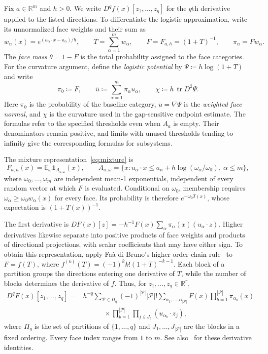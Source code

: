 \documentclass[11pt,letterpaper]{article}
\theoremstyle{remark}
\newcommand{\E}{\mathbb E}
\newcommand{\R}{\mathbb R}
\newcommand{\tr}{\operatorname{tr}}
\newcommand{\ind}{\mathbf 1}
\begin{document}
Fix \(a\in\R^m\) and \(h>0\). We write
\(D^qf(x)[z_1,\ldots,z_q]\) for the \(q\)th derivative applied to
the listed directions. To differentiate the logistic approximation,
write its unnormalized face weights and their sum as
\[
 w_\alpha(x)=e^{(u_\alpha\cdot x-a_\alpha)/h},\qquad
 T=\sum_{\alpha=1}^m w_\alpha,\qquad
 F=F_{a,h}=(1+T)^{-1},\qquad \pi_\alpha=Fw_\alpha.
\]
The \emph{face mass} \(\theta=1-F\) is the total probability assigned
to the face categories. For the curvature argument, define the
\emph{logistic potential} by \(\Psi\coloneqq h\log(1+T)\) and write
\[
 \pi_0\coloneqq F,\qquad
 \bar u\coloneqq\sum_{\alpha=1}^m\pi_\alpha u_\alpha,
 \qquad \chi\coloneqq h\,\tr D^2\Psi.
\]
Here \(\pi_0\) is the probability of the baseline category,
\(\bar u=\nabla\Psi\) is the \emph{weighted face normal}, and
\(\chi\) is the curvature used in the gap-sensitive endpoint
estimate. The formulas refer to the specified thresholds even when
\(A_a\) is empty. Their denominators remain positive, and limits
with unused thresholds tending to infinity give the corresponding
formulas for subsystems.

The mixture representation~\eqref{eq:mixture} is
\[
 F_{a,h}(x)=\E_\omega\ind_{A_{a,\omega}}(x),\qquad
 A_{a,\omega}=\{x:u_\alpha\cdot x\le
 a_\alpha+h\log(\omega_\alpha/\omega_0),\ \alpha\le m\},
\]
where \(\omega_0,\ldots,\omega_m\) are independent mean-1
exponentials, independent of every random vector at which \(F\) is
evaluated. Conditional on \(\omega_0\), membership requires
\(\omega_\alpha\ge\omega_0w_\alpha(x)\) for every face.
Its probability is therefore \(e^{-\omega_0T(x)}\), whose
expectation is \((1+T(x))^{-1}\).

The first derivative is
\(DF(x)[z]=-h^{-1}F(x)\sum_\alpha\pi_\alpha(x)(u_\alpha\cdot z)\).
Higher derivatives likewise separate into positive products of face
weights and products of directional projections, with scalar coefficients
that may have either sign. To obtain this representation, apply
Fa\`a di Bruno's higher-order chain rule~\cite{Comtet1974}
to \(F=f(T)\), where
\(f^{(k)}(T)=(-1)^k k!(1+T)^{-k-1}\). Each block of a partition
groups the directions entering one derivative of \(T\), while the
number of blocks determines the derivative of \(f\). Thus, for
\(z_1,\ldots,z_q\in\R^r\),
\begin{equation}
 \begin{split}
 D^qF(x)[z_1,\ldots,z_q]
 ={}&h^{-q}\sum_{\mathcal P\in\Pi_q}(-1)^{|\mathcal P|}|\mathcal P|!
 \sum_{\alpha_1,\ldots,\alpha_{|\mathcal P|}}
 F(x)\prod_{b=1}^{|\mathcal P|}\pi_{\alpha_b}(x)\\
 &\hspace{3em}\times
 \prod_{b=1}^{|\mathcal P|}\prod_{j\in J_b}
 (u_{\alpha_b}\cdot z_j),
 \end{split}
 \label{appx-eq:partition-derivative}
\end{equation}
where \(\Pi_q\) is the set of partitions of \(\{1,\ldots,q\}\)
and \(J_1,\ldots,J_{|\mathcal P|}\) are the blocks in a fixed
ordering. Every face index ranges from \(1\) to \(m\).
See also~\cite[Lemma~13]{GaoZhang} for these derivative identities.
\end{document}
